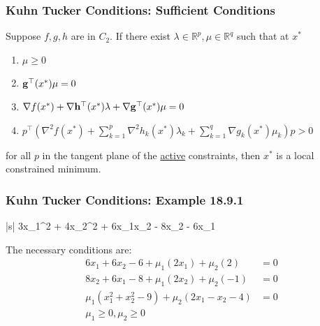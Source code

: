 \documentclass{beamer}
\begin{document}
\begin{frame}\frametitle{Kuhn Tucker Conditions: Sufficient Conditions}	
	\begin{theorem}[Moon 18.7]
		Suppose $f,g,h$ are in $C_2$.
		If there exist $\lambda \in \mathbb{R}^p, \mu \in \mathbb{R}^q$ such that at $x^{\ast}$
		\begin{enumerate}
		  \item $\mu \geq 0$
		  \item $\mathbf{g}^\top (x^{\ast})\mu = 0$
		  \item $\nabla f(x^{\ast}) + \nabla \mathbf{h}^\top (x^{\ast})\lambda + \nabla \mathbf{g}^\top (x^{\ast})\mu = 0$
		  \item $p^\top (\nabla^2f(x^{\ast}) + \sum_{k=1}^p \nabla^2 h_k(x^{\ast})\lambda_k + \sum_{k=1}^q \nabla g_k(x^{\ast})\mu_k )p > 0 $
		\end{enumerate}
		for all $p$ in the tangent plane of the \underline{active} constraints, then $x^{\ast}$ is a local constrained minimum.		
	\end{theorem}
\end{frame}

\begin{frame}\frametitle{Kuhn Tucker Conditions: Example 18.9.1}
	\begin{mini*}|s|
		{}{3x_1^2 + 4x_2^2 + 6x_1x_2 - 8x_2 - 6x_1}{}{}
	\end{mini*}
	The necessary conditions are:
	\begin{align*}
		6x_1 + 6x_2 - 6 + \mu_1(2x_1)+\mu_2(2) &= 0\\
		8x_2 + 6x_1 - 8 + \mu_1(2x_2)+\mu_2(-1) &= 0\\
		\mu_1(x_1^2+x_2^2-9) + \mu_2(2x_1 - x_2 - 4) &= 0 \\
		\mu_1 \geq 0, \mu_2 \geq 0
	\end{align*}
\end{frame}
\end{document}
